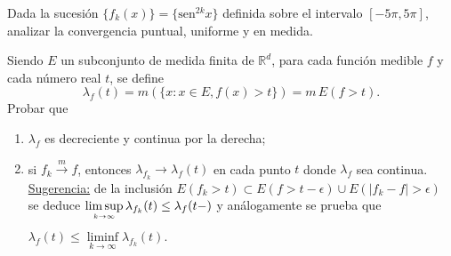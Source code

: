 \documentclass{book}
\newcommand{\rr}{\mathbb{R}}
\begin{document}
\begin{ejer}{} 
Dada la sucesión $\{f_k(x)\}=\{\text{sen}^{2k} x\}$ definida sobre el intervalo $[-5 \pi, 5\pi]$, 
analizar  la convergencia puntual, uniforme y en medida.
\end{ejer}



\begin{ejer}{} 
 Siendo $E$ un subconjunto de medida finita de $\rr^d$,\;  para cada función medible $f$
y cada n\'umero real $t$, se define
$$\lambda_f(t)=m(\{x:x\in E,f(x)>t\})=m\,E(f>t).$$
Probar que 
	\begin{enumerate}
  \item $\lambda_f$ es decreciente y continua por la derecha;
  \item si $f_k \stackrel {m}{\rightarrow}f$, entonces $\lambda_{f_k} \rightarrow \lambda_f(t)$
  en cada punto $t$ donde $\lambda_f$ sea continua.
\\
  \underline{Sugerencia:}
de la inclusión $E(f_k>t)\subset E(f>t-\epsilon)\cup E(|f_k-f|>\epsilon) $
se deduce \;$\limsup\limits_{{k\rightarrow \infty}\atop} \lambda_{f_k}(t)\leq \lambda_{f}(t-)$\; y análogamente se prueba que 
\;$\lambda_f(t)\leq \liminf\limits_{k\rightarrow \infty} \lambda_{f_k}(t).\;$
	\end{enumerate}
\end{ejer}

\end{document}
